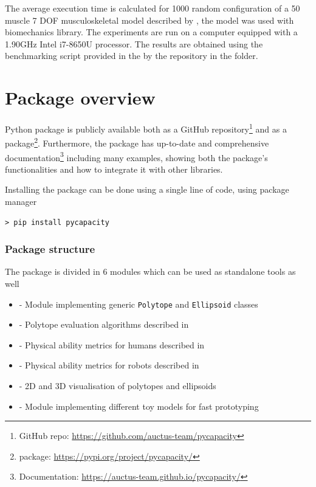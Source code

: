 The average execution time is calculated for 1000 random configuration of a 50 muscle 7 DOF musculoskeletal model described by \citet{holzbaur2005model}, the model was used with  \cite{Michaud2021} biomechanics library. The experiments are run on a computer equipped with a 1.90GHz Intel i7-8650U processor. The results are obtained using the benchmarking script provided in the by the repository in the  folder. 

\section{Package overview}
\label{sec:pycapacity_package_overview}
Python package  is publicly available both as a GitHub repository\footnote{GitHub repo: \url{https://github.com/auctus-team/pycapacity}} and as a  package\footnote{ package: \url{https://pypi.org/project/pycapacity/}}. Furthermore, the package has up-to-date and comprehensive documentation\footnote{Documentation: \url{https://auctus-team.github.io/pycapacity/}} including many examples, showing both the package's functionalities and how to integrate it with other libraries. 

Installing the package can be done using a single line of code, using  package manager 
\begin{verbatim}
> pip install pycapacity
\end{verbatim}

\subsubsection*{Package structure}
The package is divided in 6 modules which can be used as standalone tools as well
\begin{itemize}
    \item {} - Module implementing generic \texttt{Polytope} and \texttt{Ellipsoid} classes 
    \item {} - Polytope evaluation algorithms described in  
    \item {} - Physical ability metrics for humans described in 
    \item {} - Physical ability metrics for robots described in 
    \item {} - 2D and 3D visualisation of polytopes and ellipsoids
    \item {} - Module implementing different toy models for fast prototyping
\end{itemize}



